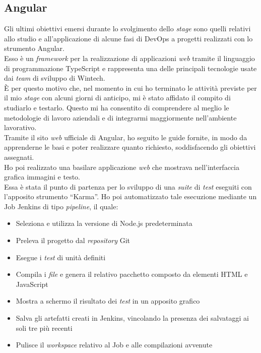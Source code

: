 \subsection{Angular}
Gli ultimi obiettivi emersi durante lo svolgimento dello \emph{stage} sono quelli relativi allo studio e all'applicazione di alcune fasi di \gls{DevOps} a progetti realizzati con lo strumento Angular.\\
Esso è un \emph{framework} per la realizzazione di applicazioni \emph{web} tramite il linguaggio di programmazione TypeScript e rappresenta una delle principali tecnologie usate dai \emph{team} di sviluppo di Wintech.\\
È per questo motivo che, nel momento in cui ho terminato le attività previste per il mio \emph{stage} con alcuni giorni di anticipo, mi è stato affidato il compito di studiarlo e testarlo.
Questo mi ha consentito di comprendere al meglio le metodologie di lavoro aziendali e di integrarmi maggiormente nell'ambiente lavorativo.\\
Tramite il sito \emph{web} ufficiale di Angular, ho seguito le guide fornite, in modo da apprenderne le basi e poter realizzare quanto richiesto, soddisfacendo gli obiettivi assegnati.\\
Ho poi realizzato una basilare applicazione \emph{web} che mostrava nell'interfaccia grafica immagini e testo.\\
Essa è stata il punto di partenza per lo sviluppo di una \emph{suite} di \emph{test} eseguiti con l'apposito strumento “Karma”.
Ho poi automatizzato tale esecuzione mediante un Job Jenkins di tipo \emph{pipeline}, il quale: 
\begin{itemize}
    \item Seleziona e utilizza la versione di Node.js predeterminata
    \item Preleva il progetto dal \emph{repository} Git
    \item Esegue i \emph{test} di unità definiti
    \item Compila i \emph{file} e genera il relativo pacchetto composto da elementi HTML e JavaScript
    \item Mostra a schermo il risultato dei \emph{test} in un apposito grafico
    \item Salva gli artefatti creati in Jenkins, vincolando la presenza dei salvataggi ai soli tre più recenti
    \item Pulisce il \emph{workspace} relativo al Job e alle compilazioni avvenute  
\end{itemize}


